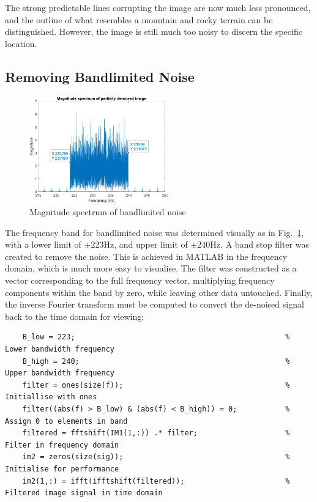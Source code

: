 \documentclass[12pt]{article}
\numberwithin{equation}{section}
\numberwithin{figure}{section}
\numberwithin{table}{section}
\begin{document}
The strong predictable lines corrupting the image are now much less pronounced,
and the outline of what resembles a mountain and rocky terrain can be
distinguished. However, the image is still much too noisy to discern the
specific location. \pagebreak
\subsection{Removing Bandlimited Noise}

\begin{figure}
    \vspace*{-12pt}
    \centering
    \includegraphics[width=6cm]{figures/p2-bandnoise.png}
    \caption{Magnitude spectrum of bandlimited noise\label{fig:p2-bandnoise}}
\end{figure}

The frequency band for bandlimited noise was determined visually as in
Fig.~\ref{fig:p2-bandnoise}, with a lower limit of $\pm 223$Hz, and upper limit
of $\pm 240$Hz. A band stop filter was created to remove the noise. This is
achieved in MATLAB in the frequency domain, which is much more easy to
visualise. The filter was constructed as a vector corresponding to the full
frequency vector, multiplying frequency components within the band by zero,
while leaving other data untouched. Finally, the inverse Fourier transform must
be computed to convert the de-noised signal back to the time domain for
viewing:
\begin{verbatim}
    B_low = 223;                                                % Lower bandwidth frequency
    B_high = 240;                                               % Upper bandwidth frequency
    filter = ones(size(f));                                     % Initiallise with ones
    filter((abs(f) > B_low) & (abs(f) < B_high)) = 0;           % Assign 0 to elements in band
    filtered = fftshift(IM1(1,:)) .* filter;                    % Filter in frequency domain
    im2 = zeros(size(sig));                                     % Initialise for performance
    im2(1,:) = ifft(ifftshift(filtered));                       % Filtered image signal in time domain
\end{verbatim}
\end{document}
